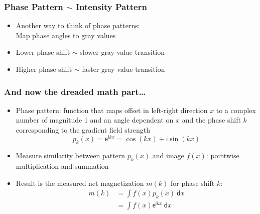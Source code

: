 \begin{frame}
	\frametitle{Phase Pattern $\sim$ Intensity Pattern}
	
	\begin{itemize}
		\item Another way to think of phase patterns: \\
		Map phase angles to gray values
	\end{itemize}
	
	\begin{center}
		\begingroup
		
		
		
		\endgroup
	\end{center}
	
	\begin{itemize}
		\item Lower phase shift $\sim$ slower gray value transition
		\item Higher phase shift $\sim$ faster gray value transition
	\end{itemize}
\end{frame}

\begin{frame}
	\frametitle{And now the dreaded math part\ldots}
	
	\begin{itemize}
		\item Phase pattern: function that maps offset in left-right direction $x$ to a complex number of magnitude 1 and an angle dependent on $x$ and the phase shift $k$ corresponding to the gradient field strength
		$$p_k(x) = \mathsf e^{\mathsf ikx} = \cos(kx) + \mathsf i \sin(kx)$$
		
		\item<2> Measure similarity between pattern $p_k(x)$ and image $f(x)$: pointwise multiplication and summation
		\item<2> Result is the measured net magnetization $m(k)$ for phase shift $k$:
		\begin{align*}
			m(k) &= \int f(x)p_k(x)\ \mathsf dx \\
			     &= \int f(x)\mathsf e^{\mathsf ikx}\ \mathsf dx
		\end{align*}
	\end{itemize}
\end{frame}

